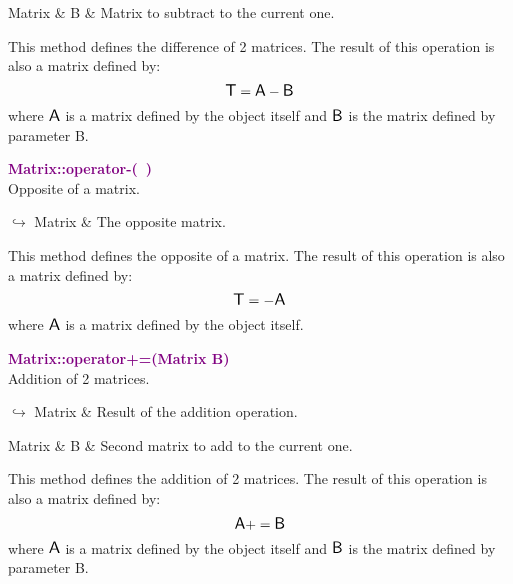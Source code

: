 \begin{tcolorbox}[width=\textwidth,myArgs,tabularx={ll|R}]
Matrix & B & Matrix to subtract to the current one.
\end{tcolorbox}

This method defines the difference of 2 matrices.
The result of this operation is also a matrix defined by:
\begin{equation*}
\mbox{\large\ensuremath{\mathsf{T}}} = \mbox{\large\ensuremath{\mathsf{A}}} - \mbox{\large\ensuremath{\mathsf{B}}}
\end{equation*}
where $\mbox{\large\ensuremath{\mathsf{A}}}$ is a matrix defined by the object itself and $\mbox{\large\ensuremath{\mathsf{B}}}$ is the matrix defined by parameter B.

\textcolor{purple}{\textbf{Matrix::operator-(~)}}\label{Matrix::operator-()}\\
Opposite of a matrix.\vspace*{-0.5em}
\begin{tcolorbox}[grow to left by=-1cm, width=\textwidth-1cm,myArgs,tabularx={l|R}]
$\hookrightarrow$ Matrix & The opposite matrix.
\end{tcolorbox}

This method defines the opposite of a matrix.
The result of this operation is also a matrix defined by:
\begin{equation*}
\mbox{\large\ensuremath{\mathsf{T}}} = - \mbox{\large\ensuremath{\mathsf{A}}}
\end{equation*}
where $\mbox{\large\ensuremath{\mathsf{A}}}$ is a matrix defined by the object itself.

\textcolor{purple}{\textbf{Matrix::operator+=(Matrix B)}}\label{Matrix::operator+=(Matrix B)}\\
Addition of 2 matrices.\vspace*{-0.5em}
\begin{tcolorbox}[grow to left by=-1cm, width=\textwidth-1cm,myArgs,tabularx={l|R}]
$\hookrightarrow$ Matrix & Result of the addition operation.
\end{tcolorbox}

\begin{tcolorbox}[width=\textwidth,myArgs,tabularx={ll|R}]
Matrix & B & Second matrix to add to the current one.
\end{tcolorbox}

This method defines the addition of 2 matrices.
The result of this operation is also a matrix defined by:
\begin{equation*}
\mbox{\large\ensuremath{\mathsf{A}}} += \mbox{\large\ensuremath{\mathsf{B}}}
\end{equation*}
where $\mbox{\large\ensuremath{\mathsf{A}}}$ is a matrix defined by the object itself and $\mbox{\large\ensuremath{\mathsf{B}}}$ is the matrix defined by parameter B.

